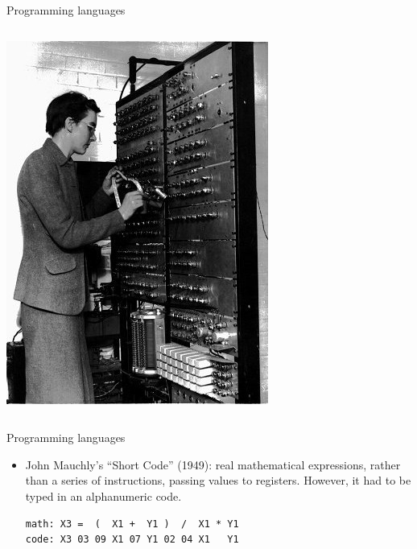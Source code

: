 \documentclass[aspectratio=169]{beamer}
\begin{document}
\begin{frame}{Programming languages}
\begin{itemize}
\begin{columns}
\includegraphics[width=\linewidth]{PLOTS/kathleen-booth.jpg}
\end{columns}
\end{itemize}
\end{frame}

\begin{frame}[fragile]{Programming languages}
\vspace{0.35 cm}
\begin{itemize}\setlength{\itemsep}{0.35 cm}
\item John Mauchly's ``Short Code'' (1949): real mathematical expressions, rather than a series of instructions, passing values to registers. However, it had to be typed in an alphanumeric code.

\vspace{0.5 cm}
\begin{minipage}{0.8\linewidth}
\begin{verbatim}
math: X3 =  (  X1 +  Y1 )  /  X1 * Y1
code: X3 03 09 X1 07 Y1 02 04 X1   Y1
\end{verbatim}
\end{minipage}

\vspace{0.5 cm}
\end{itemize}
\end{frame}
\end{document}
